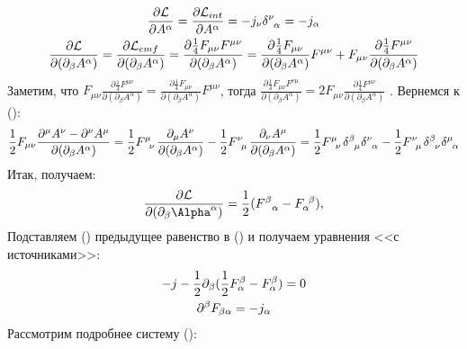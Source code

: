 \documentclass[__main__.tex]{subfiles}
\begin{document}
\begin{gather}
    \frac{\partial \mathcal{L}}{\partial A^\alpha}=
    \frac{\partial \mathcal{L}_{int}}{\partial  A^\alpha}=
    -j_\nu\delta\indices{^\nu_\alpha} = -j_\alpha \llabel{eq:dlint} \\
    \frac{\partial  \mathcal{L}}{\partial(\partial_\beta A^\alpha)}=\frac{\partial  \mathcal{L}_{emf}}{\partial(\partial_\beta A^\alpha)}=
    \frac{\partial\frac{1}{4}F_{\mu\nu}F^{\mu\nu}}{\partial(\partial_\beta A^\alpha)} =
    \frac{\partial\frac{1}{4}F_{\mu\nu}}{\partial(\partial_\beta A^\alpha)}F^{\mu\nu}+F_{\mu\nu}\frac{\partial\frac{1}{4}F^{\mu\nu}}{\partial(\partial_\beta A^\alpha)} \llabel{eq:dlda}
\end{gather}
Заметим, что
$F_{\mu\nu}\frac{\partial\frac{1}{4}F^{\mu\nu}}{\partial(\partial_\beta A^\alpha)}=\frac{\partial\frac{1}{4}F_{\mu\nu}}{\partial(\partial_\beta A^\alpha)}F^{\mu\nu}$, тогда $\frac{\partial\frac{1}{4}F_{\mu\nu}F^{\nu\mu}}{\partial(\partial_\beta A^\alpha)}=2F_{\mu\nu}\frac{\partial\frac{1}{4}F^{\mu\nu}}{\partial(\partial_\beta A^\alpha)}$
. Вернемся к ():
\begin{gather}
    \frac{1}{2}F_{\mu\nu}\frac{\partial^\mu A^\nu-\partial^\nu A^\mu}{{\partial(\partial_\beta A^\alpha)}}=
    \frac{1}{2}F\indices{^{\mu}_\nu}\frac{\partial_\mu A^\nu}{{\partial(\partial_\beta A^\alpha)}}-\frac{1}{2}F\indices{^{\nu}_\mu}\frac{\partial_\nu A^\mu}{{\partial(\partial_\beta A^\alpha)}}=
    \frac{1}{2}\tensor{F}{^{\mu}_\nu}\tensor{\delta}{^{\beta}_\mu}\tensor{\delta}{^{\nu}_\alpha}-\frac{1}{2}\tensor{F}{^{\nu}_\mu}\tensor{\delta}{^{\beta}_\nu}\tensor{\delta}{^{\mu}_\alpha}
\end{gather}
Итак, получаем:
\begin{gather}
    \frac{\partial \mathcal{L}}{\partial(\partial_\beta\Alpha^\alpha)}
    =
    \frac{1}{2}(F^\beta_{\ \ \alpha}-F_\alpha^{\ \beta}),
\end{gather}
Подставляем () предыдущее равенство в () и получаем уравнения <<с источниками>>:
\begin{gather}
    -j-\frac{1}{2}\partial_\beta(\frac{1}{2}F^\beta_\alpha-F_\alpha^\beta)=0\\
    \partial^\beta F_{\beta\alpha}=-j_\alpha \llabel{eq:dbfba}
\end{gather}
Рассмотрим подробнее систему ():
\end{document}
